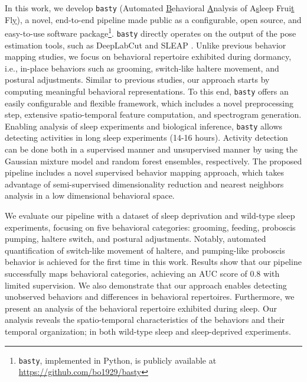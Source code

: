 In this work, we develop \texttt{basty} (Automated \underline{B}ehavioral \underline{A}nalysis of A\underline{s}leep Frui\underline{t} Fl\underline{y}), a novel, end-to-end pipeline made public as a configurable, open source, and easy-to-use software package\footnote{\texttt{basty}, implemented in Python, is publicly available at \url{https://github.com/bo1929/basty}}.
\texttt{basty} directly operates on the output of the pose estimation tools, such as DeepLabCut \citep{mathis_deeplabcut_2018} and SLEAP \cite{pereira_sleap_2022}.
Unlike previous behavior mapping studies, we focus on behavioral repertoire exhibited during dormancy, i.e., in-place behaviors such as grooming, switch-like haltere movement, and postural adjustments.
Similar to previous studies, our approach starts by computing meaningful behavioral representations.
To this end, \texttt{basty} offers an easily configurable and flexible framework, which includes a novel preprocessing step, extensive spatio-temporal feature computation, and spectrogram generation.
Enabling analysis of sleep experiments and biological inference, \texttt{basty} allows detecting activities in long sleep experiments (14-16 hours).
Activity detection can be done both in a supervised manner and unsupervised manner by using the Gaussian mixture model and random forest ensembles, respectively.
The proposed pipeline includes a novel supervised behavior mapping approach, which takes advantage of semi-supervised dimensionality reduction and nearest neighbors analysis in a low dimensional behavioral space.

We evaluate our pipeline with a dataset of sleep deprivation and wild-type sleep experiments, focusing on five behavioral categories: grooming, feeding, proboscis pumping, haltere switch, and postural adjustments.
Notably, automated quantification of switch-like movement of haltere, and pumping-like proboscis behavior is achieved for the first time in this work.
Results show that our pipeline successfully maps behavioral categories, achieving an AUC score of 0.8 with limited supervision.
We also demonstrate that our approach enables detecting unobserved behaviors and differences in behavioral repertoires.
Furthermore, we present an analysis of the behavioral repertoire exhibited during sleep.
Our analysis reveals the spatio-temporal characteristics of the behaviors and their temporal organization; in both wild-type sleep and sleep-deprived experiments.


